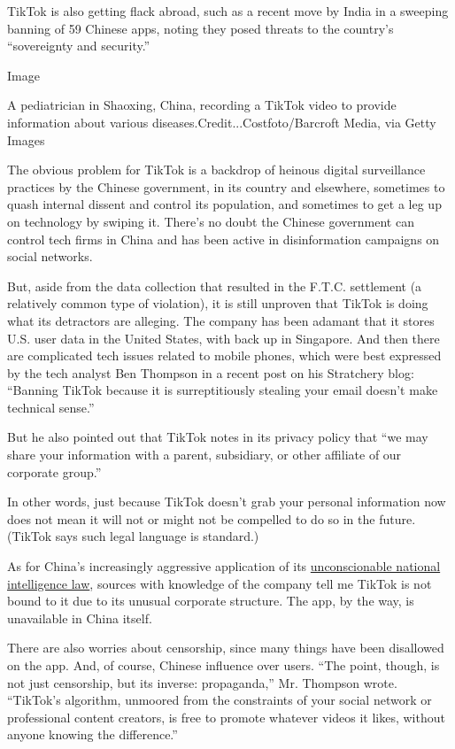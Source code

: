 TikTok is also getting flack abroad, such as a recent move by India in a
sweeping banning of 59 Chinese apps, noting they posed threats to the
country's ``sovereignty and security.''

Image

A pediatrician in Shaoxing, China, recording a TikTok video to provide
information about various diseases.Credit...Costfoto/Barcroft Media, via
Getty Images

The obvious problem for TikTok is a backdrop of heinous digital
surveillance practices by the Chinese government, in its country and
elsewhere, sometimes to quash internal dissent and control its
population, and sometimes to get a leg up on technology by swiping it.
There's no doubt the Chinese government can control tech firms in China
and has been active in disinformation campaigns on social networks.

But, aside from the data collection that resulted in the F.T.C.
settlement (a relatively common type of violation), it is still unproven
that TikTok is doing what its detractors are alleging. The company has
been adamant that it stores U.S. user data in the United States, with
back up in Singapore. And then there are complicated tech issues related
to mobile phones, which were best expressed by the tech analyst Ben
Thompson in a recent post on his Stratchery blog: ``Banning TikTok
because it is surreptitiously stealing your email doesn't make technical
sense.''

But he also pointed out that TikTok notes in its privacy policy that
``we may share your information with a parent, subsidiary, or other
affiliate of our corporate group.''

In other words, just because TikTok doesn't grab your personal
information now does not mean it will not or might not be compelled to
do so in the future. (TikTok says such legal language is standard.)

As for China's increasingly aggressive application of its
\href{https://www.nytimes.com/2020/06/28/world/asia/china-hong-kong-national-security-law.html?searchResultPosition=1}{unconscionable
national intelligence law}, sources with knowledge of the company tell
me TikTok is not bound to it due to its unusual corporate structure. The
app, by the way, is unavailable in China itself.

There are also worries about censorship, since many things have been
disallowed on the app. And, of course, Chinese influence over users.
``The point, though, is not just censorship, but its inverse:
propaganda,'' Mr. Thompson wrote. ``TikTok's algorithm, unmoored from
the constraints of your social network or professional content creators,
is free to promote whatever videos it likes, without anyone knowing the
difference.''

